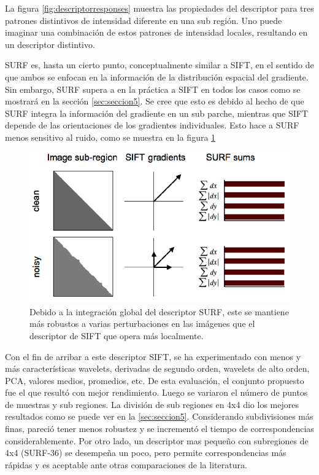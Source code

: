 La figura \ref{fig:descriptorresponses} muestra las propiedades del descriptor para tres patrones distintivos de intensidad diferente en una sub región. Uno puede imaginar una combinación de estos patrones de intensidad locales, resultando en un descriptor distintivo.

SURF es, hasta un cierto punto, conceptualmente similar a SIFT, en el sentido de que ambos se enfocan en la información de la distribución espacial del gradiente. Sin embargo, SURF supera a en la práctica a SIFT en todos los casos como se mostrará en la sección \ref{sec:seccion5}. Se cree que esto es debido al hecho de que SURF integra la información del gradiente en un sub parche, mientras que SIFT depende de las orientaciones de los gradientes individuales. Esto hace a SURF menos sensitivo al ruido, como se muestra en la figura \ref{fig:surflesssensitivetonoise}

\begin{figure}[tbhp]
   \centering
        \includegraphics[scale=0.4]{./figs/surflesssensitivetonoise}
    \caption[]{Debido a la integración global del descriptor SURF, este se mantiene más robustos a varias perturbaciones en las imágenes que el descriptor de SIFT que opera más localmente.}
   \label{fig:surflesssensitivetonoise}                %
\end{figure}
Con el fin de arribar a este descriptor SIFT, se ha experimentado con menos y más características wavelets, derivadas de segundo orden, wavelets de alto orden, PCA, valores medios, promedios, etc. De esta evaluación, el conjunto propuesto fue el que resultó con mejor rendimiento. Luego se variaron el número de puntos de muestras y sub regiones. La división de sub regiones en 4x4 dio los mejores resultados como se puede ver en la \ref{sec:seccion5}. Considerando subdivisiones más finas, pareció tener menos robustez y se incrementó el tiempo de correspondencias considerablemente. Por otro lado, un descriptor mas pequeño con subregiones de 4x4 (SURF-36) se desempeña un poco, pero permite correspondencias más rápidas y es aceptable ante otras comparaciones de la literatura. 

